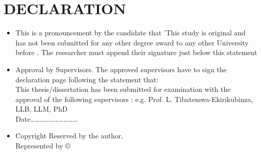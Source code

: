 \section*{DECLARATION}

\begin{itemize}

\item This is a pronouncement by the candidate that 'This study
is original and has not been submitted for any other degree award to any
other University before . The researcher must append their signature just below
this statement
\item Approval by Supervisors. The approved supervisors have to sign the
declaration page following the statement that:\\
 This thesis/dissertation has been submitted for examination with the approval
of the following supervisors : e.g.
Prof. L. Tibatemwa-Ekirikubinza,\\
LLB, LLM, PhD\\
Date…………………………
\item Copyright Reserved by the author,\\
Represented by ©

\end{itemize}
